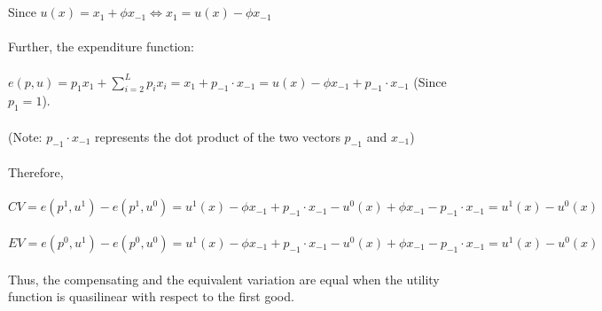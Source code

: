 \documentclass[12pt]{article}
\newenvironment{problem}[2][Problem]{\begin{trivlist}
\item[\hskip \labelsep {\bfseries #1}\hskip \labelsep {\bfseries #2.}]}{\end{trivlist}}
\begin{document}
\begin{problem}{2} .\\ \\
Since $u(x) = x_1 +  \phi x_{-1} \iff x_1 = u(x) - \phi x_{-1} $
\\
\\
Further, the expenditure function:
\\
\\
$e(p, u) = p_1 x_1 + \displaystyle \sum_{i=2}^{L} p_i x_i  
= x_1 + p_{-1} \cdot x_{-1} =  u(x) - \phi x_{-1} + p_{-1} \cdot x_{-1} $ (Since $p_1 = 1 $).
\\
\\
(Note: $p_{-1} \cdot x_{-1} $ represents the dot product of the two vectors $p_{-1}$ and  $x_{-1}$) 
\\
\\
Therefore,
\\
\\
$CV = e(p^1, u^1) - e(p^1, u^0) = u^1(x) - \phi x_{-1} + p_{-1} \cdot x_{-1} - u^0(x) + \phi x_{-1} - p_{-1} \cdot x_{-1} =  u^1(x) - u^0(x)$ 
\\
\\
$EV = e(p^0, u^1) - e(p^0, u^0) = u^1(x) - \phi x_{-1} + p_{-1} \cdot x_{-1} - u^0(x) + \phi x_{-1} - p_{-1} \cdot x_{-1} =  u^1(x) - u^0(x)$ 
\\
\\
Thus, the compensating and the equivalent variation are equal when the utility
function is quasilinear with respect to the first good.
\\
\pagebreak
\end{problem}
\end{document}
